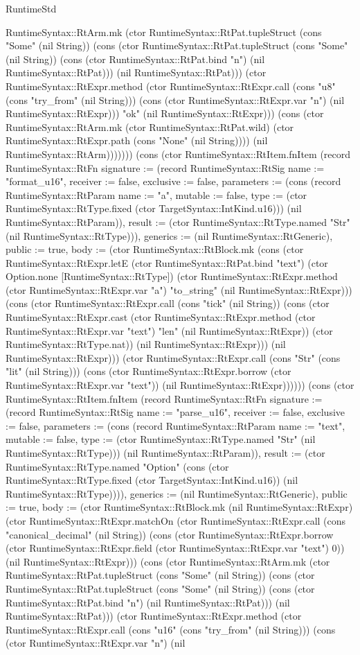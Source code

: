 \begin{lexlean}{RuntimeStd}
\begin{semanticmodule}
{RuntimeSyntax::RtArm.mk (ctor RuntimeSyntax::RtPat.tupleStruct (cons "Some" (nil String)) (cons (ctor RuntimeSyntax::RtPat.tupleStruct (cons "Some" (nil String)) (cons (ctor RuntimeSyntax::RtPat.bind "n") (nil RuntimeSyntax::RtPat))) (nil RuntimeSyntax::RtPat))) (ctor RuntimeSyntax::RtExpr.method (ctor RuntimeSyntax::RtExpr.call (cons "u8" (cons "try_from" (nil String))) (cons (ctor RuntimeSyntax::RtExpr.var "n") (nil RuntimeSyntax::RtExpr))) "ok" (nil RuntimeSyntax::RtExpr))) (cons (ctor RuntimeSyntax::RtArm.mk (ctor RuntimeSyntax::RtPat.wild) (ctor RuntimeSyntax::RtExpr.path (cons "None" (nil String)))) (nil RuntimeSyntax::RtArm)))))})) (cons (ctor RuntimeSyntax::RtItem.fnItem (record RuntimeSyntax::RtFn {signature := (record RuntimeSyntax::RtSig {name := "format_u16", receiver := false, exclusive := false, parameters := (cons (record RuntimeSyntax::RtParam {name := "a", mutable := false, type := (ctor RuntimeSyntax::RtType.fixed (ctor TargetSyntax::IntKind.u16))}) (nil RuntimeSyntax::RtParam)), result := (ctor RuntimeSyntax::RtType.named "Str" (nil RuntimeSyntax::RtType))}), generics := (nil RuntimeSyntax::RtGeneric), public := true, body := (ctor RuntimeSyntax::RtBlock.mk (cons (ctor RuntimeSyntax::RtExpr.letE (ctor RuntimeSyntax::RtPat.bind "text") (ctor Option.none [RuntimeSyntax::RtType]) (ctor RuntimeSyntax::RtExpr.method (ctor RuntimeSyntax::RtExpr.var "a") "to_string" (nil RuntimeSyntax::RtExpr))) (cons (ctor RuntimeSyntax::RtExpr.call (cons "tick" (nil String)) (cons (ctor RuntimeSyntax::RtExpr.cast (ctor RuntimeSyntax::RtExpr.method (ctor RuntimeSyntax::RtExpr.var "text") "len" (nil RuntimeSyntax::RtExpr)) (ctor RuntimeSyntax::RtType.nat)) (nil RuntimeSyntax::RtExpr))) (nil RuntimeSyntax::RtExpr))) (ctor RuntimeSyntax::RtExpr.call (cons "Str" (cons "lit" (nil String))) (cons (ctor RuntimeSyntax::RtExpr.borrow (ctor RuntimeSyntax::RtExpr.var "text")) (nil RuntimeSyntax::RtExpr))))})) (cons (ctor RuntimeSyntax::RtItem.fnItem (record RuntimeSyntax::RtFn {signature := (record RuntimeSyntax::RtSig {name := "parse_u16", receiver := false, exclusive := false, parameters := (cons (record RuntimeSyntax::RtParam {name := "text", mutable := false, type := (ctor RuntimeSyntax::RtType.named "Str" (nil RuntimeSyntax::RtType))}) (nil RuntimeSyntax::RtParam)), result := (ctor RuntimeSyntax::RtType.named "Option" (cons (ctor RuntimeSyntax::RtType.fixed (ctor TargetSyntax::IntKind.u16)) (nil RuntimeSyntax::RtType)))}), generics := (nil RuntimeSyntax::RtGeneric), public := true, body := (ctor RuntimeSyntax::RtBlock.mk (nil RuntimeSyntax::RtExpr) (ctor RuntimeSyntax::RtExpr.matchOn (ctor RuntimeSyntax::RtExpr.call (cons "canonical_decimal" (nil String)) (cons (ctor RuntimeSyntax::RtExpr.borrow (ctor RuntimeSyntax::RtExpr.field (ctor RuntimeSyntax::RtExpr.var "text") 0)) (nil RuntimeSyntax::RtExpr))) (cons (ctor RuntimeSyntax::RtArm.mk (ctor RuntimeSyntax::RtPat.tupleStruct (cons "Some" (nil String)) (cons (ctor RuntimeSyntax::RtPat.tupleStruct (cons "Some" (nil String)) (cons (ctor RuntimeSyntax::RtPat.bind "n") (nil RuntimeSyntax::RtPat))) (nil RuntimeSyntax::RtPat))) (ctor RuntimeSyntax::RtExpr.method (ctor RuntimeSyntax::RtExpr.call (cons "u16" (cons "try_from" (nil String))) (cons (ctor RuntimeSyntax::RtExpr.var "n") (nil }
\end{semanticmodule}
\end{lexlean}
